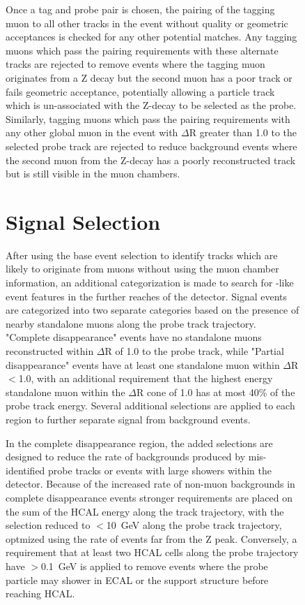 \begin{figure}[htpb]
Once a tag and probe pair is chosen, the pairing of the tagging muon to all other tracks in the event without quality or geometric acceptances is checked for any other potential matches.
Any tagging muons which pass the pairing requirements with these alternate tracks are rejected to remove events where the tagging muon originates from a Z decay but the second muon has a poor track or fails geometric acceptance, potentially allowing a particle track which is un-associated with the Z-decay to be selected as the probe.
Similarly, tagging muons which pass the pairing requirements with any other global muon in the event with $\Delta$R greater than 1.0 to the selected probe track are rejected to reduce background events where the second muon from the Z-decay has a poorly reconstructed track but is still visible in the muon chambers.

\section{Signal Selection}
After using the base event selection to identify tracks which are likely to originate from muons without using the muon chamber information, an additional categorization is made to search for \dbrem-like event features in the further reaches of the detector.
Signal events are categorized into two separate categories based on the presence of nearby standalone muons along the probe track trajectory.
"Complete disappearance" events have no standalone muons reconstructed within $\Delta$R of 1.0 to the probe track, while "Partial disappearance" events have at least one standalone muon within $\Delta$R$<$1.0, with an additional requirement that the highest energy standalone muon within the $\Delta$R cone of 1.0 has at most 40$\%$ of the probe track energy.
Several additional selections are applied to each region to further separate signal from background events.

In the complete disappearance region, the added selections are designed to reduce the rate of backgrounds produced by mis-identified probe tracks or events with large showers within the detector.
Because of the increased rate of non-muon backgrounds in complete disappearance events stronger requirements are placed on the sum of the HCAL energy along the track trajectory, with the selection reduced to $<$\SI{10}{\giga\eV} along the probe track trajectory, optmized using the rate of events far from the Z peak. 
Conversely, a requirement that at least two HCAL cells along the probe trajectory have $>$\SI{0.1}{\giga\eV} is applied to remove events where the probe particle may shower in ECAL or the support structure before reaching HCAL.


\end{figure}
